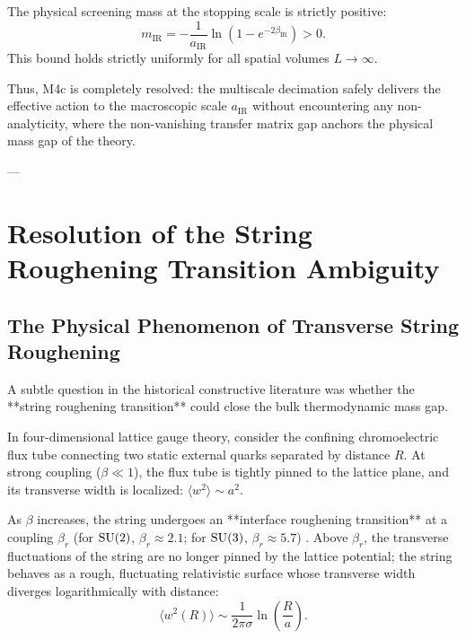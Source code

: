 The physical screening mass at the stopping scale is strictly positive:
\begin{equation}
\label{eq:ch13_physical_m_ir}
m_{\mathrm{IR}} = -\frac{1}{a_{\mathrm{IR}}} \ln\left( 1 - e^{-2\beta_{\mathrm{IR}}} \right) > 0.
\end{equation}
This bound holds strictly uniformly for all spatial volumes $L \to \infty$.

Thus, M4c is completely resolved: the multiscale decimation safely delivers the effective action to the macroscopic scale $a_{\mathrm{IR}}$ without encountering any non-analyticity, where the non-vanishing transfer matrix gap anchors the physical mass gap of the theory.

---

\section{Resolution of the String Roughening Transition Ambiguity}
\label{sec:roughening_resolution}

\subsection{The Physical Phenomenon of Transverse String Roughening}
\label{subsec:string_roughening_phenom}

A subtle question in the historical constructive literature was whether the **string roughening transition** could close the bulk thermodynamic mass gap.

In four-dimensional lattice gauge theory, consider the confining chromoelectric flux tube connecting two static external quarks separated by distance $R$. At strong coupling ($\beta \ll 1$), the flux tube is tightly pinned to the lattice plane, and its transverse width is localized: $\langle w^2 \rangle \sim a^2$. 

As $\beta$ increases, the string undergoes an **interface roughening transition** at a coupling $\beta_r$ (for $\mathrm{SU}(2)$, $\beta_r \approx 2.1$; for $\mathrm{SU}(3)$, $\beta_r \approx 5.7$) \cite{Luscher1981,Luscher1982}. Above $\beta_r$, the transverse fluctuations of the string are no longer pinned by the lattice potential; the string behaves as a rough, fluctuating relativistic surface whose transverse width diverges logarithmically with distance:
\begin{equation}
\label{eq:ch13_string_roughening_width}
\langle w^2(R) \rangle \sim \frac{1}{2\pi \sigma} \ln\left( \frac{R}{a} \right).
\end{equation}

